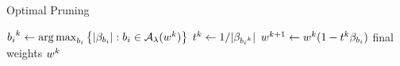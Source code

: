 \begin{algorithm}[H]
	\Large
	\caption{\large Optimal Pruning}
	\label{alg:pruning-solutions}
	\begin{algorithmic}
		\STATE \( {b_i}^k \gets \mathop{\rm arg\,max}_{{b_i}} \left\{|\beta_{b_i}| : {b_i} \in {\mathcal{A}_{\lambda}}(w^k)\right\}  \)
		\STATE \( t^k \gets 1/|\beta_{{b_i}^k}| \)
		\STATE \( w^{k+1} \gets w^k (1 - t^k \beta_{b_i}) \)
		\ENDWHILE
		 final weights \( w^k \)
	\end{algorithmic}
\end{algorithm}


